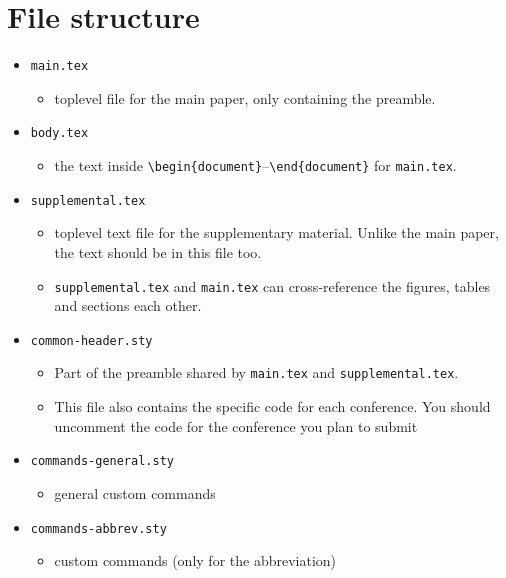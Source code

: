 \section{File structure}

\begin{itemize}

\item
  \texttt{main.tex}

  \begin{itemize}
  
  \item
    toplevel file for the main paper, only containing the preamble.
  \end{itemize}
\item
  \texttt{body.tex}

  \begin{itemize}
  
  \item
    the text inside
    \texttt{\textbackslash{}begin\{document\}}--\texttt{\textbackslash{}end\{document\}}
    for \texttt{main.tex}.
  \end{itemize}
\item
  \texttt{supplemental.tex}

  \begin{itemize}
  
  \item
    toplevel text file for the supplementary material. Unlike the main
    paper, the text should be in this file too.
  \item
    \texttt{supplemental.tex} and \texttt{main.tex} can cross-reference
    the figures, tables and sections each other.
  \end{itemize}
\item
  \texttt{common-header.sty}

  \begin{itemize}
  
  \item
    Part of the preamble shared by \texttt{main.tex} and
    \texttt{supplemental.tex}.
  \item
    This file also contains the specific code for each conference. You
    should uncomment the code for the conference you plan to submit
  \end{itemize}
\item
  \texttt{commands-general.sty}

  \begin{itemize}
  
  \item
    general custom commands
  \end{itemize}
\item
  \texttt{commands-abbrev.sty}

  \begin{itemize}
  
  \item
    custom commands (only for the abbreviation)
  \end{itemize}
\end{itemize}

